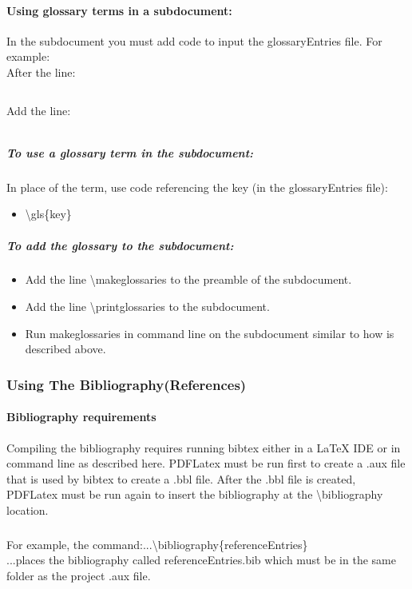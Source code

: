 \documentclass[class=book , crop=false]{standalone}
\begin{document}
\paragraph{Using glossary terms in a subdocument:}
In the subdocument you must add code to input the glossaryEntries file.  For example:\\
After the line:
\begin{verbatim}

\end{verbatim}
Add the line:
\begin{verbatim}

\end{verbatim}
\subparagraph[To use a glossary term]{To use a glossary term in the subdocument:\texorpdfstring{\\}{}}
In place of the term, use code referencing the key (in the glossaryEntries file):
\begin{itemize}
\item \textbackslash gls\{key\}
\end{itemize}
\subparagraph{To add the glossary to the subdocument:}
\begin{itemize}
\item Add the line \textbackslash makeglossaries to the preamble of the subdocument.
\item Add the line \textbackslash printglossaries to the subdocument.
\item Run makeglossaries in command line on the subdocument similar to how is described above.
\end{itemize}




\subsubsection[Using The Bibliography(References)]{{\Large Using The Bibliography(References)}}
\paragraph{Bibliography requirements}
Compiling the bibliography requires running bibtex either in a \LaTeX{} IDE or in command line as described here.  PDFLatex must be run first to create a .aux file that is used by bibtex to create a .bbl file.  After the .bbl file is created, PDFLatex must be run again to insert the bibliography at the \textbackslash bibliography location.
\subparagraph*{}
For example, the command:...\textbackslash bibliography\{referenceEntries\}\\
...places the bibliography called referenceEntries.bib which must be in the same folder as the project .aux file.
\end{document}
